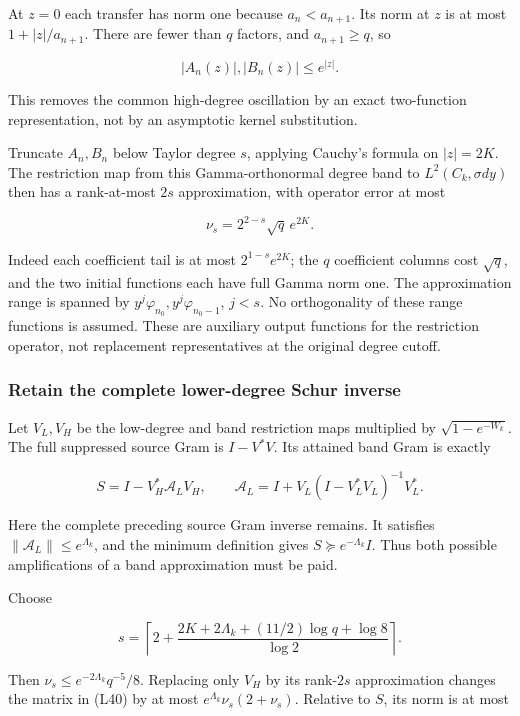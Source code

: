 At \(z=0\) each transfer has norm one because \(a_n<a_{n+1}\). Its norm at \(z\) is at most \(1+|z|/a_{n+1}\). There are fewer than \(q\) factors, and \(a_{n+1}\ge q\), so

\[
|A_n(z)|,|B_n(z)|\le e^{|z|}.
\tag{L38}
\]

This removes the common high-degree oscillation by an exact two-function representation, not by an asymptotic kernel substitution.

Truncate \(A_n,B_n\) below Taylor degree \(s\), applying Cauchy's formula on \(|z|=2K\). The restriction map from this Gamma-orthonormal degree band to \(L^2(C_k,\sigma dy)\) then has a rank-at-most \(2s\) approximation, with operator error at most

\[
\nu_s=2^{2-s}\sqrt q\,e^{2K}.
\tag{L39}
\]

Indeed each coefficient tail is at most \(2^{1-s}e^{2K}\); the \(q\) coefficient columns cost \(\sqrt q\), and the two initial functions each have full Gamma norm one. The approximation range is spanned by
\(y^j\varphi_{n_0},y^j\varphi_{n_0-1}\), \(j<s\). No orthogonality of these range functions is assumed. These are auxiliary output functions for the restriction operator, not replacement representatives at the original degree cutoff.

\subsubsection{Retain the complete lower-degree Schur inverse}\label{retain-the-complete-lower-degree-schur-inverse}

Let \(V_L,V_H\) be the low-degree and band restriction maps multiplied by \(\sqrt{1-e^{-W_k}}\). The full suppressed source Gram is \(I-V^*V\). Its attained band Gram is exactly

\[
\boxed{S=I-V_H^*\mathcal A_LV_H,\qquad
\mathcal A_L=I+V_L(I-V_L^*V_L)^{-1}V_L^*.}
\tag{L40}
\]

Here the complete preceding source Gram inverse remains. It satisfies
\(\|\mathcal A_L\|\le e^{\Lambda_k}\), and the minimum definition gives
\(S\succeq e^{-\Lambda_k}I\). Thus both possible amplifications of a band approximation must be paid.

Choose

\[
\boxed{s=\left\lceil 2+
\frac{2K+2\Lambda_k+(11/2)\log q+\log8}{\log2}\right\rceil.}
\tag{L41}
\]

Then \(\nu_s\le e^{-2\Lambda_k}q^{-5}/8\). Replacing only \(V_H\) by its rank-\(2s\) approximation changes the matrix in (L40) by at most
\(e^{\Lambda_k}\nu_s(2+\nu_s)\). Relative to \(S\), its norm is at most

